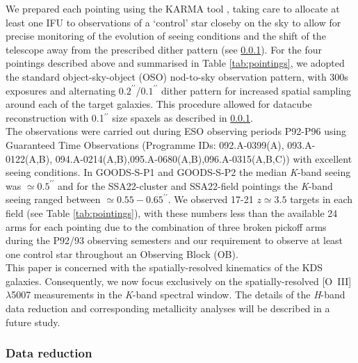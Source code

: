 \documentclass[fleqn,usenatbib]{mnras}
\begin{document}
\noindent
We prepared each pointing using the KARMA tool \citep{Wegner2008}, taking care to allocate at least one IFU to observations of a `control' star closeby on the sky to allow for precise monitoring of the evolution of seeing conditions and the shift of the telescope away from the prescribed dither pattern (see \cref{subsubsec:datareduction}).
For the four pointings described above and summarised in Table \ref{tab:pointings}, we adopted the standard object-sky-object (OSO) nod-to-sky observation pattern, with 300s exposures and alternating $0.2^{\prime\prime}$/$0.1^{\prime\prime}$ dither pattern for increased spatial sampling around each of the target galaxies.
This procedure allowed for datacube reconstruction with 0.1$^{\prime\prime}$ size spaxels as described in \cref{subsubsec:datareduction}. \\

\noindent
The observations were carried out during ESO observing periods P92-P96 using Guaranteed Time Observations (Programme IDs: 092.A-0399(A), 093.A-0122(A,B), 094.A-0214(A,B),095.A-0680(A,B),096.A-0315(A,B,C)) with excellent seeing conditions.
In GOODS-S-P1 and GOODS-S-P2 the median {\it K}-band seeing was $\simeq0.5^{\prime\prime}$ and for the SSA22-cluster and SSA22-field pointings the {\it K}-band seeing ranged between $\simeq0.55-0.65^{\prime\prime}$.
We observed 17-21 $z\simeq3.5$ targets in each field (see Table \ref{tab:pointings}), with these numbers less than the available 24 arms for each pointing due to the combination of three broken pickoff arms during the P92/93 observing semesters and our requirement to observe at least one control star throughout an Observing Block (OB). \\

\noindent
This paper is concerned with the spatially-resolved kinematics of the KDS galaxies.
Consequently, we now focus exclusively on the spatially-resolved [O~{\sc III}]$\lambda$5007 measurements in the {\it K}-band spectral window. 
The details of the {\it H}-band data reduction and corresponding metallicity analyses will be described in a future study.

\subsubsection{Data reduction}\label{subsubsec:datareduction}
\end{document}
